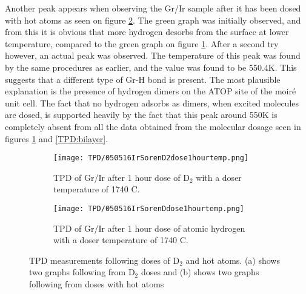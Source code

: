 \begin{table}
  \centering
\end{table}
Another peak appears when observing the Gr/Ir sample after it has been dosed with hot atoms as seen on figure \ref{TPD:D}. The green graph was initially observed, and from this it is obvious that more hydrogen desorbs from the surface at lower temperature, compared to the green graph on figure \ref{TPD:D2}. After a second try however, an actual peak was observed. The temperature of this peak was found by the same procedures as earlier, and the value was found to be 550.4K. This suggests that a different type of Gr-H bond is present. The most plausible explanation is the presence of hydrogen dimers on the ATOP site of the moiré unit cell. The fact that no hydrogen adsorbs as dimers, when excited molecules are dosed, is supported heavily by the fact that this peak around 550K is completely absent from all the data obtained from the molecular dosage seen in figures \ref{TPD:D2} and \ref{TPD:bilayer}.

\begin{figure}
  \centering
  \begin{subfigure}[b]{0.45\textwidth}
    \texttt{[image: TPD/050516IrSorenD2dose1hourtemp.png]}
    \caption{TPD of Gr/Ir after 1 hour dose of D$_2$ with a doser temperature of 1740 \degree C.}
    \label{TPD:D2}
  \end{subfigure}\hspace{0.5cm}
  \begin{subfigure}[b]{0.45\textwidth}
    \texttt{[image: TPD/050516IrSorenDdose1hourtemp.png]}
    \caption{TPD of Gr/Ir after 1 hour dose of atomic hydrogen with a doser temperature of 1740 \degree C.}
    \label{TPD:D}
  \end{subfigure}
  \caption{TPD measurements following doses of D$_2$ and hot atoms. (a) shows two graphs following from D$_2$ doses and (b) shows two graphs following from doses with hot atoms}
  \label{TPD:all}
\end{figure}

